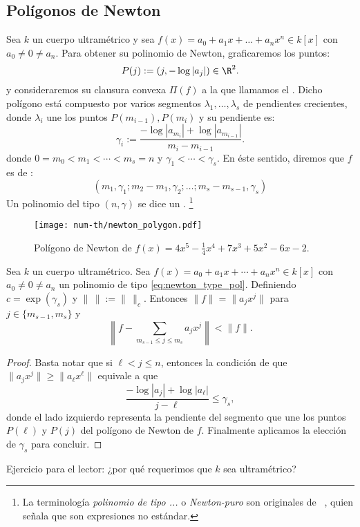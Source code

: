 \documentclass[teoria-numeros.tex]{subfiles}
\begin{document}
\subsection*{Polígonos de Newton}
Sea $k$ un cuerpo ultramétrico y sea $f(x) = a_0 + a_1x + \dots + a_nx^n \in k[x]$ con $a_0 \ne 0 \ne a_n$.
Para obtener su polinomio de Newton, graficaremos los puntos:
$$ P(j) := (j, -\log|a_j|) \in \R^2. $$
y consideraremos su clausura convexa $\Pi(f)$ a la que llamamos el .
Dicho polígono está compuesto por varios segmentos $\lambda_1, \dots, \lambda_s$ de pendientes crecientes,
donde $\lambda_i$ une los puntos $P(m_{i-1}), P(m_i)$ y su pendiente es:
$$ \gamma_i := \frac{-\log|a_{m_i}| + \log|a_{m_{i-1}}|}{m_i - m_{i-1}}. $$
donde $0 = m_0 < m_1 < \cdots < m_s = n$ y $\gamma_1 < \cdots < \gamma_s$.
En éste sentido, diremos que $f$ es de :
\begin{equation}
	(m_1, \gamma_1; m_2 - m_1, \gamma_2; \dots; m_s - m_{s-1}, \gamma_s)
	\label{eq:newton_type_pol}
\end{equation}
Un polinomio del tipo $(n, \gamma)$ se dice un .%
\footnote{La terminología \textit{polinomio de tipo ...} o \textit{Newton-puro} son originales
de \citeauthor{cassels:local_fields}~\cite[100]{cassels:local_fields}, quien señala que son expresiones no estándar.}

\begin{figure}[!hbtp]
	\centering
	\texttt{[image: num-th/newton\_polygon.pdf]}
	\caption{Polígono de Newton de $f(x) = 4x^5 - \frac 14 x^4 + 7x^3 + 5x^2 - 6x - 2$.}%
	\label{fig:newton-polygon}
\end{figure}

\begin{lem}\label{lem:newton_norms}
	Sea $k$ un cuerpo ultramétrico.
	Sea $f(x) = a_0 + a_1x + \cdots + a_nx^n \in k[x]$ con $a_0 \ne 0 \ne a_n$ un polinomio de tipo \eqref{eq:newton_type_pol}.
	Definiendo $c = \exp(\gamma_s)$ y $\|\,\| := \|\,\|_c$.
	Entonces $\|f\| = \|a_jx^j\|$ para $j \in \{ m_{s-1}, m_s \}$ y
	$$ \left\| f - \sum_{m_{s-1} \le j \le m_s} a_jx^j \right\| < \|f\|. $$
\end{lem}
\begin{proof}
	Basta notar que si $\ell < j \le n$, entonces la condición de que $\|a_jx^j\| \ge \|a_\ell x^\ell\|$ equivale a que
	$$ \frac{-\log|a_j| + \log|a_\ell|}{j - \ell} \le \gamma_s, $$
	donde el lado izquierdo representa la pendiente del segmento que une los puntos $P(\ell)$ y $P(j)$ del polígono de Newton de $f$.
	Finalmente aplicamos la elección de $\gamma_s$ para concluir.
\end{proof}
Ejercicio para el lector: ¿por qué requerimos que $k$ sea ultramétrico?
\end{document}
